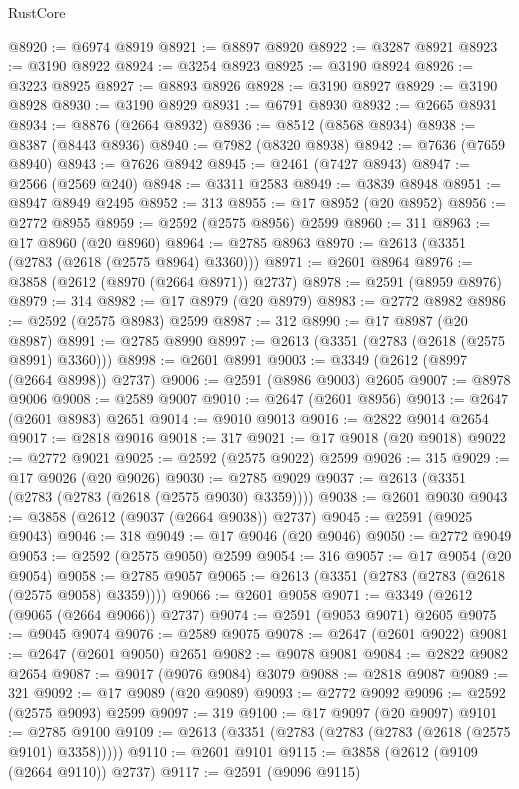 \begin{lexlean}{RustCore}
\begin{coremodule}
@8920 := @6974 @8919
@8921 := @8897 @8920
@8922 := @3287 @8921
@8923 := @3190 @8922
@8924 := @3254 @8923
@8925 := @3190 @8924
@8926 := @3223 @8925
@8927 := @8893 @8926
@8928 := @3190 @8927
@8929 := @3190 @8928
@8930 := @3190 @8929
@8931 := @6791 @8930
@8932 := @2665 @8931
@8934 := @8876 (@2664 @8932)
@8936 := @8512 (@8568 @8934)
@8938 := @8387 (@8443 @8936)
@8940 := @7982 (@8320 @8938)
@8942 := @7636 (@7659 @8940)
@8943 := @7626 @8942
@8945 := @2461 (@7427 @8943)
@8947 := @2566 (@2569 @240)
@8948 := @3311 @2583
@8949 := @3839 @8948
@8951 := @8947 @8949 @2495
@8952 := 313
@8955 := @17 @8952 (@20 @8952)
@8956 := @2772 @8955
@8959 := @2592 (@2575 @8956) @2599
@8960 := 311
@8963 := @17 @8960 (@20 @8960)
@8964 := @2785 @8963
@8970 := @2613 (@3351 (@2783 (@2618 (@2575 @8964) @3360)))
@8971 := @2601 @8964
@8976 := @3858 (@2612 (@8970 (@2664 @8971)) @2737)
@8978 := @2591 (@8959 @8976)
@8979 := 314
@8982 := @17 @8979 (@20 @8979)
@8983 := @2772 @8982
@8986 := @2592 (@2575 @8983) @2599
@8987 := 312
@8990 := @17 @8987 (@20 @8987)
@8991 := @2785 @8990
@8997 := @2613 (@3351 (@2783 (@2618 (@2575 @8991) @3360)))
@8998 := @2601 @8991
@9003 := @3349 (@2612 (@8997 (@2664 @8998)) @2737)
@9006 := @2591 (@8986 @9003) @2605
@9007 := @8978 @9006
@9008 := @2589 @9007
@9010 := @2647 (@2601 @8956)
@9013 := @2647 (@2601 @8983) @2651
@9014 := @9010 @9013
@9016 := @2822 @9014 @2654
@9017 := @2818 @9016
@9018 := 317
@9021 := @17 @9018 (@20 @9018)
@9022 := @2772 @9021
@9025 := @2592 (@2575 @9022) @2599
@9026 := 315
@9029 := @17 @9026 (@20 @9026)
@9030 := @2785 @9029
@9037 := @2613 (@3351 (@2783 (@2783 (@2618 (@2575 @9030) @3359))))
@9038 := @2601 @9030
@9043 := @3858 (@2612 (@9037 (@2664 @9038)) @2737)
@9045 := @2591 (@9025 @9043)
@9046 := 318
@9049 := @17 @9046 (@20 @9046)
@9050 := @2772 @9049
@9053 := @2592 (@2575 @9050) @2599
@9054 := 316
@9057 := @17 @9054 (@20 @9054)
@9058 := @2785 @9057
@9065 := @2613 (@3351 (@2783 (@2783 (@2618 (@2575 @9058) @3359))))
@9066 := @2601 @9058
@9071 := @3349 (@2612 (@9065 (@2664 @9066)) @2737)
@9074 := @2591 (@9053 @9071) @2605
@9075 := @9045 @9074
@9076 := @2589 @9075
@9078 := @2647 (@2601 @9022)
@9081 := @2647 (@2601 @9050) @2651
@9082 := @9078 @9081
@9084 := @2822 @9082 @2654
@9087 := @9017 (@9076 @9084) @3079
@9088 := @2818 @9087
@9089 := 321
@9092 := @17 @9089 (@20 @9089)
@9093 := @2772 @9092
@9096 := @2592 (@2575 @9093) @2599
@9097 := 319
@9100 := @17 @9097 (@20 @9097)
@9101 := @2785 @9100
@9109 := @2613 (@3351 (@2783 (@2783 (@2783 (@2618 (@2575 @9101) @3358)))))
@9110 := @2601 @9101
@9115 := @3858 (@2612 (@9109 (@2664 @9110)) @2737)
@9117 := @2591 (@9096 @9115)

\end{coremodule}
\end{lexlean}
